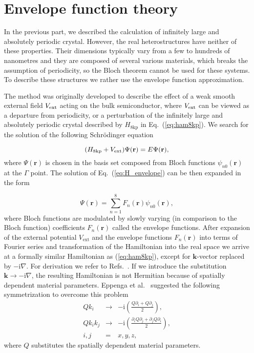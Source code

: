

\section{Envelope function theory}
\label{secTheorEnvelope}

In the previous part, we described the calculation of infinitely large and absolutely periodic crystal. However, the real heterostructures have neither of these properties. Their dimensions typically vary from a few to hundreds of nanometres and they are composed of several various materials, which breaks the assumption of periodicity, so the Bloch theorem cannot be used for these systems. To describe these structures we rather use the envelope function approximation.

The method was originally developed to describe the effect of a weak smooth external field $V_{\rm ext}$ acting on the bulk semiconductor, where $V_{\rm ext}$ can be viewed as a departure from periodicity, or a perturbation of the infinitely large and absolutely periodic crystal described by  $H_\mathrm{8kp}$ in Eq.~(\ref{eq:ham8kp}). We search for the solution of the following Schr\"{o}dinger equation

\begin{equation}
(H_\mathrm{8kp}+V_{\rm ext})\Psi(\mathbf{r})=E\Psi(\mathbf{r}), \label{eq:H_envelope}
\end{equation}
where $\Psi(\mathbf{r})$ is chosen in the basis set composed from Bloch functions $\psi_{n0}(\mathbf{r})$ at the $\Gamma$ point. The solution of Eq.~(\ref{eq:H_envelope}) can be then expanded in the form
 
 \begin{equation}
 \label{eqEnvelope}
 \Psi(\mathbf{r})=\sum_{n=1}^8 F_n(\mathbf{r})\psi_{n0}(\mathbf{r}),
 \end{equation}
where Bloch functions are modulated by slowly varying (in comparison to the Bloch function) coefficients $F_n(\mathbf{r})$ called the envelope functions. After expansion of the external potential $V_\mathrm{ext}$ and the envelope functions $F_n(\mathbf{r})$ into terms of Fourier series and transformation of the Hamiltonian into the real space we arrive at a formally similar Hamiltonian as (\ref{eq:ham8kp}), except for $\mathbf{k}$-vector replaced by $-\mathrm{i}\nabla$. For derivation we refer to Refs.~\citep{Bastard1,Bastard2}. If we introduce the substitution $\mathbf{k}\rightarrow -\mathrm{i}\nabla$, the resulting Hamiltonian is not Hermitian because of spatially dependent material parameters. Eppenga et al.~\citep{Eppenga} suggested the following symmetrization to overcome this problem
\begin{eqnarray}
Qk_i&\rightarrow&-\mathrm{i}\left(\frac{Q\partial_i+Q\partial_j}{2}\right),\nonumber\\
Qk_ik_j&\rightarrow&-\mathrm{i}\left(\frac{\partial_iQ\partial_j+\partial_jQ\partial_i}{2}\right),\nonumber\\
i,j&=&x,y,z,\nonumber
\end{eqnarray}
where $Q$ substitutes the spatially dependent material parameters. 

